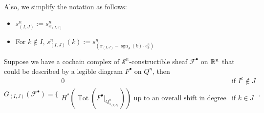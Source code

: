 Also, we simplify the notation as follows:
\begin{itemize}
\item $s^n_{(I,J)}:= s^n_{x_{(I,J)}}$

\item For $k\not\in I$, $s^n_{(I,J)}(k):= s^n_{(x_{(I,J)} - \operatorname{sgn}_J(k)\cdot e^n_k)}$ 
\end{itemize}
\begin{lemma}\label{morse}
Suppose we have a cochain complex of $\mathcal{S}^n$-constructible sheaf $\mathscr{F}^\bullet$ on $\mathbb{R}^n$ that could be described by a legible diagram $F^\bullet$ on $Q^n$, then
\[G_{(I,J)}(\mathscr{F}^\bullet)=\bigg\{
\begin{array}{ll}
    0 & \text{if } I^c \not\in J \\
	H^*(\operatorname{Tot}(F^\bullet|_{Q^n_{s_{(I,J)}}}))\text{ up to an overall shift in degree} & \text{if } k\in J \\
\end{array}
\bigg.
\]
\end{lemma}

